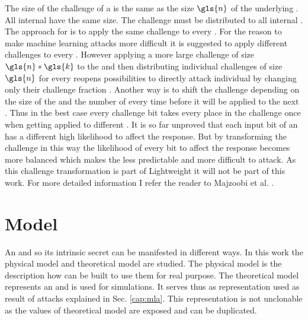 The size of the challenge of a \xpuf is the same as the size $\gls{n}$ of the underlying \apufs.
All internal \apufs have the same size.
The challenge must be distributed to all internal \apufs.
The approach for \xpufs is to apply the same challenge to every \apuf.
For the reason to make machine learning attacks more difficult it is suggested to apply different challenges to every \apuf.
However applying a more large challenge of size $\gls{n} * \gls{k}$ to the \xpuf and then distributing individual challenges of size $\gls{n}$ for every \apuf reopens possibilities to directly attack individual \apufs by changing only their challenge fraction \cite{Becker2015ThePUFs}.
Another way is to shift the challenge depending on the size of the \puf and the number of \apufs every time before it will be applied to the next \apuf.
Thus in the best case every challenge bit takes every place in the challenge once when getting applied to different \apufs.
It is so far unproved that each input bit of an \apuf has a different high likelihood to affect the response.
But by transforming the challenge in this way the likelihood of every bit to affect the response becomes more balanced which makes the \puf less predictable and more difficult to attack.
As this challenge transformation is part of Lightweight \pufs it will not be part of this work.
For more detailed information I refer the reader to Majzoobi et al. \cite{Majzoobi2008LightweightPUFs} .


\section{Model}

An \apuf and so its intrinsic secret can be manifested in different ways.
In this work the physical model and theoretical model are studied.
The physical model is the description how \apufs can be built to use them for real purpose.
The theoretical model represents an \apuf and is used for simulations.
It serves thus as representation used as result of attacks explained in Sec. \ref{cap:mla}.
This representation is not unclonable as the values of theoretical model are exposed and can be duplicated.


